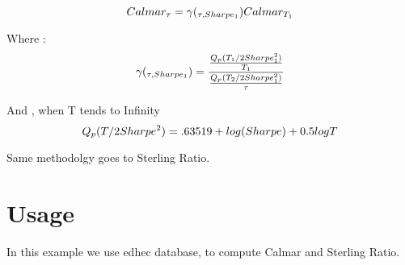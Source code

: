 \documentclass[12pt,letterpaper,english]{article}
\begin{document}
\begin{equation}
Calmar_{\tau}  =  \gamma(_{\tau , Sharpe_{1}})Calmar_{T_{1}}  \\
\end{equation}

Where : 
  \begin{equation}
\gamma(_{\tau , Sharpe_{1}})  =  \frac{\frac{Q_p(T_1/2Sharpe^2_{1})}{T_1}}{\frac{Q_p(T_2/2Sharpe^2_{1})}{\tau}} \\
\end{equation}

 And , when T tends to  Infinity
\begin{equation}
Q_p(T/2Sharpe^2)  =  .63519 + log (Sharpe)  + 0.5 log T\\
\end{equation}

Same methodolgy goes to Sterling Ratio.
\section{Usage}

In this example we use edhec database, to compute Calmar and Sterling Ratio.
\end{document}
